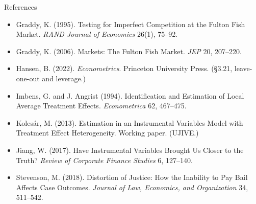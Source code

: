 \documentclass[
  11pt,
  ignorenonframetext,
  aspectratio=169,
]{beamer}
\begin{document}
\begin{frame}{References}
\begin{itemize}
  Instruments: What, When, Why, and How. \emph{AER} 110, 2586--2624.
\item
  Graddy, K. (1995). Testing for Imperfect Competition at the Fulton
  Fish Market. \emph{RAND Journal of Economics} 26(1), 75--92.
\item
  Graddy, K. (2006). Markets: The Fulton Fish Market. \emph{JEP} 20,
  207--220.
\item
  Hansen, B. (2022). \emph{Econometrics}. Princeton University Press.
  (§3.21, leave-one-out and leverage.)
\item
  Imbens, G. and J. Angrist (1994). Identification and Estimation of
  Local Average Treatment Effects. \emph{Econometrica} 62, 467--475.
\item
  Kolesár, M. (2013). Estimation in an Instrumental Variables Model with
  Treatment Effect Heterogeneity. Working paper. (UJIVE.)
\item
  Jiang, W. (2017). Have Instrumental Variables Brought Us Closer to the
  Truth? \emph{Review of Corporate Finance Studies} 6, 127--140.
\item
  Stevenson, M. (2018). Distortion of Justice: How the Inability to Pay
  Bail Affects Case Outcomes. \emph{Journal of Law, Economics, and
  Organization} 34, 511--542.
\end{itemize}
\end{frame}
\end{document}

